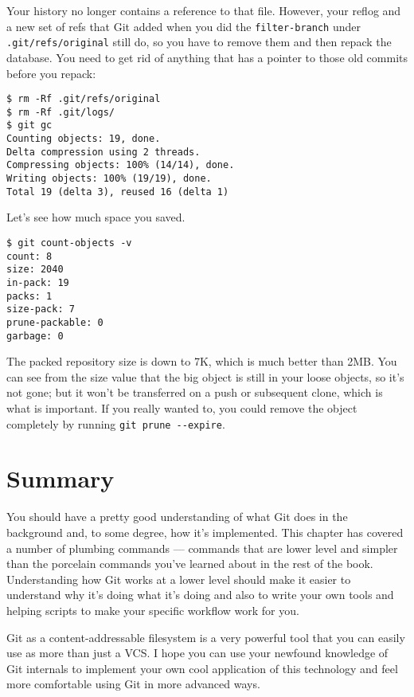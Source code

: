 \documentclass[a4paper]{book}
\newcounter{tab}[chapter]
\begin{document}
Your history no longer contains a reference to that file. However, your reflog and a new set of refs that Git added when you did the \texttt{filter-branch} under \texttt{.git/refs/original} still do, so you have to remove them and then repack the database. You need to get rid of anything that has a pointer to those old commits before you repack:

\begin{shaded}\begin{verbatim}
$ rm -Rf .git/refs/original
$ rm -Rf .git/logs/
$ git gc
Counting objects: 19, done.
Delta compression using 2 threads.
Compressing objects: 100% (14/14), done.
Writing objects: 100% (19/19), done.
Total 19 (delta 3), reused 16 (delta 1)
\end{verbatim}\end{shaded}

Let's see how much space you saved.

\begin{shaded}\begin{verbatim}
$ git count-objects -v
count: 8
size: 2040
in-pack: 19
packs: 1
size-pack: 7
prune-packable: 0
garbage: 0
\end{verbatim}\end{shaded}

The packed repository size is down to 7K, which is much better than 2MB. You can see from the size value that the big object is still in your loose objects, so it's not gone; but it won't be transferred on a push or subsequent clone, which is what is important. If you really wanted to, you could remove the object completely by running \texttt{git prune -{}-expire}.

\section{Summary}\label{summary-9}

You should have a pretty good understanding of what Git does in the background and, to some degree, how it's implemented. This chapter has covered a number of plumbing commands --- commands that are lower level and simpler than the porcelain commands you've learned about in the rest of the book. Understanding how Git works at a lower level should make it easier to understand why it's doing what it's doing and also to write your own tools and helping scripts to make your specific workflow work for you.

Git as a content-addressable filesystem is a very powerful tool that you can easily use as more than just a VCS. I hope you can use your newfound knowledge of Git internals to implement your own cool application of this technology and feel more comfortable using Git in more advanced ways.
\end{document}

